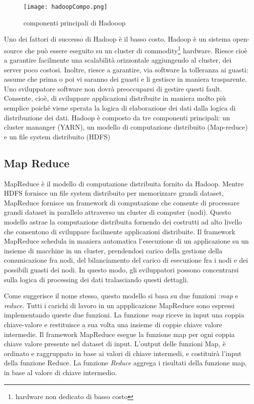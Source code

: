 \begin{figure}[h]
\centering
\texttt{[image: hadoopCompo.png]}
\caption{componenti principali di Hadooop}
\label{fig:hadoopComponets}
\end{figure} 
 
Uno dei fattori di successo di Hadoop è il basso costo. Hadoop è un sistema open-source che può essere eseguito su un cluster di commodity\footnote{hardware non dedicato di basso costo} hardware. Riesce cioè a garantire facilmente una scalabilità orizzontale aggiungendo al cluster, dei server poco costosi. Inoltre, riesce a garantire, via software la tolleranza ai guasti: assume che prima o poi vi saranno dei guasti e li gestisce in maniera trasparente. Uno sviluppatore software non dovrà preoccuparsi di gestire questi fault. Consente, cioè, di sviluppare applicazioni distribuite in maniera molto più semplice poiché viene sperata la logica di elaborazione dei dati dalla logica di distribuzione dei dati.
Hadoop è composto da tre componenti principali: un cluster mananger (YARN), un modello di computazione distribuito (Map-reduce) e un file system distribuito (HDFS)



 
 \subsection{Map Reduce}
 MapReduce è il modello di computazione distribuita fornito da Hadoop. Mentre HDFS fornisce un file system distribuito per memorizzare grandi dataset, MapReduce fornisce un framework di computazione che consente di processare grandi dataset in parallelo attraverso un cluster di computer (nodi). Questo modello astrae la computazione distribuita fornendo dei costrutti ad alto livello che consentono di sviluppare facilmente applicazioni distribuite.
 Il framework MapReduce schedula in maniera automatica l'esecuzione di un applicazione su un insieme di macchine in un cluster, prendendosi carico  della gestione della comunicazione fra nodi, del bilanciamento del carico di esecuzione fra i nodi e dei possibili guasti dei nodi.
In questo modo, gli sviluppatori possono concentrarsi sulla logica di processing dei dati tralasciando questi dettagli.

Come suggerisce il nome stesso, questo modello si basa su due funzioni :\emph{map}   e \emph{reduce}. Tutti i carichi di lavoro in un appplicazione MapReduce sono espressi implementando queste due funzioni.
La funzione \emph{map} riceve in input una coppia chiave-valore e restituisce a sua volta una insieme di  coppie chiave valore intermedie. Il framework MapReduce esegue la funzione map per ogni coppia chiave valore presente nel dataset di input. L'output delle funzioni Map, è ordinato e raggruppato in base ai valori di chiave intermedi, e costituirà l'input della funzione Reduce. La funzione \emph{Reduce} aggrega i risultati della funzione map, in base al valore di chiave intermedio.

